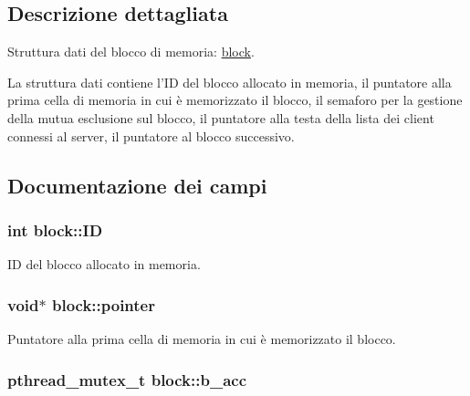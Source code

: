 \subsection{Descrizione dettagliata}
Struttura dati del blocco di memoria: \hyperlink{structblock}{block}. 

La struttura dati contiene l'ID del blocco allocato in memoria, il puntatore alla prima cella di memoria in cui è memorizzato il blocco, il semaforo per la gestione della mutua esclusione sul blocco, il puntatore alla testa della lista dei client connessi al server, il puntatore al blocco successivo. 

\subsection{Documentazione dei campi}
\hypertarget{structblock_c56acfb3538cc5823dc0223f812f87ce_c56acfb3538cc5823dc0223f812f87ce}{
\subsubsection[{ID}]{\setlength{\rightskip}{0pt plus 5cm}int {\bf block::ID}}}
\label{structblock_c56acfb3538cc5823dc0223f812f87ce_c56acfb3538cc5823dc0223f812f87ce}


ID del blocco allocato in memoria. 

\hypertarget{structblock_bcf5e0be544c8d79ef9037ecfb46bb4c_bcf5e0be544c8d79ef9037ecfb46bb4c}{
\subsubsection[{pointer}]{\setlength{\rightskip}{0pt plus 5cm}void$\ast$ {\bf block::pointer}}}
\label{structblock_bcf5e0be544c8d79ef9037ecfb46bb4c_bcf5e0be544c8d79ef9037ecfb46bb4c}


Puntatore alla prima cella di memoria in cui è memorizzato il blocco. 

\hypertarget{structblock_36a983c8b5ed4f991ed2be58cebb506e_36a983c8b5ed4f991ed2be58cebb506e}{
\subsubsection[{b\_\-acc}]{\setlength{\rightskip}{0pt plus 5cm}pthread\_\-mutex\_\-t {\bf block::b\_\-acc}}}
\label{structblock_36a983c8b5ed4f991ed2be58cebb506e_36a983c8b5ed4f991ed2be58cebb506e}


